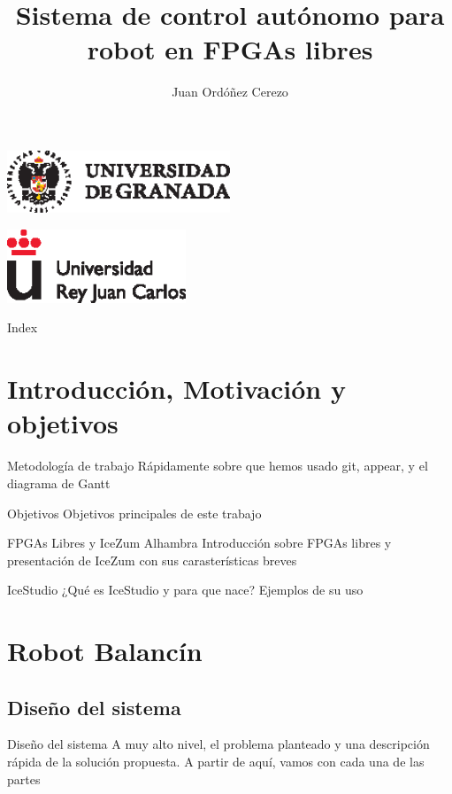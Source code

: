 \documentclass{beamer}
\title{Sistema de control autónomo para robot en FPGAs libres}
\subtitle{}
\author{Juan Ordóñez Cerezo\inst{1}}
\institute[Universidad de Granada] %
{
  \inst{1}%
  Universidad de Granada
}
\date{}
\begin{document}
\begin{frame}
  \begin{center}
  \includegraphics [width =0.5\textwidth ]{logo_ugr}
  \end{center}
    \begin{center}
	\includegraphics [width =0.4\textwidth ]{logo_rey}
	\end{center}
  \titlepage


\end{frame}

\begin{frame}{Index}
  \tableofcontents
\end{frame}

\section{Introducción, Motivación y objetivos}
\begin{frame}{Metodología de trabajo}
Rápidamente sobre que hemos usado git, appear, y el diagrama de Gantt
\end{frame}
\begin{frame}{Objetivos}
Objetivos principales de este trabajo
\end{frame}
\begin{frame}{FPGAs Libres y IceZum Alhambra}
Introducción sobre FPGAs libres y presentación de IceZum con sus carasterísticas breves
\end{frame}
\begin{frame}{IceStudio}
¿Qué es IceStudio y para que nace? Ejemplos de su uso
\end{frame}

\section{Robot Balancín}
\subsection{Diseño del sistema}
\begin{frame}{Diseño del sistema}
A muy alto nivel, el problema planteado y una descripción rápida de la solución propuesta. A partir de aquí, vamos con cada una de las partes
\end{frame}	
\end{document}
